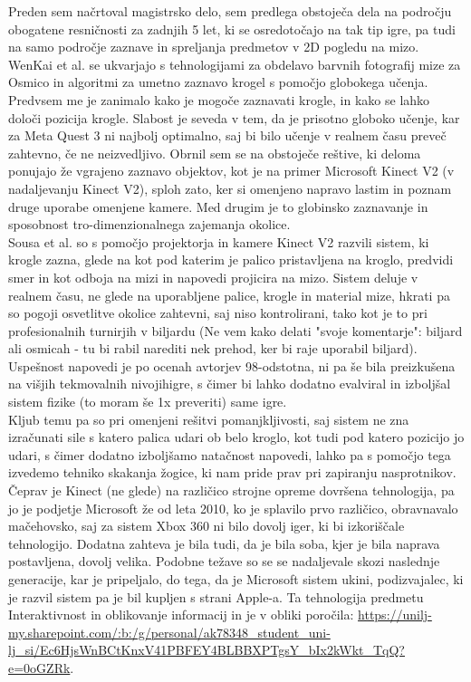 \documentclass[a4paper, 12pt]{article}
\begin{document}
Preden sem načrtoval magistrsko delo, sem predlega obstoječa dela na področju obogatene resničnosti
za zadnjih 5 let, ki se osredotočajo na tak tip igre, pa tudi na samo področje zaznave in
spreljanja predmetov v 2D pogledu na mizo. WenKai et al. \cite{WenKai2024} se ukvarjajo s tehnologijami za
obdelavo barvnih fotografij mize za Osmico in algoritmi za umetno zaznavo krogel s pomočjo
globokega učenja. Predvsem me je zanimalo kako je mogoče zaznavati krogle, in kako se lahko določi
pozicija krogle. Slabost je seveda v tem, da je prisotno globoko učenje, kar za Meta
Quest 3 ni najbolj optimalno, saj bi bilo učenje v realnem času preveč zahtevno, če ne neizvedljivo.
Obrnil sem se na obstoječe reštive, ki deloma ponujajo že vgrajeno zaznavo objektov, kot je na primer
Microsoft Kinect V2 (v nadaljevanju Kinect V2), sploh zato, ker si omenjeno napravo lastim in poznam druge uporabe omenjene
kamere. Med drugim je to globinsko zaznavanje in sposobnost tro-dimenzionalnega zajemanja okolice. \\
Sousa et al. \cite{Sousa2016} so s pomočjo projektorja in kamere Kinect V2 razvili sistem,
ki krogle zazna, glede na kot pod katerim je palico pristavljena na kroglo, predvidi smer in kot odboja
na mizi in napovedi projicira na mizo. Sistem deluje v realnem času, ne glede na uporabljene palice,
krogle in material mize, hkrati pa so pogoji osvetlitve okolice zahtevni, saj niso kontrolirani, tako kot je
to pri profesionalnih turnirjih v biljardu (Ne vem kako delati "svoje komentarje": biljard ali osmicah - tu bi rabil
narediti nek prehod, ker bi raje uporabil biljard). Uspešnost napovedi je po ocenah avtorjev 98-odstotna, ni pa še bila preizkušena na višjih 
tekmovalnih nivojihigre, s čimer bi lahko dodatno evalviral in izboljšal sistem fizike (to moram še 1x preveriti) same igre.  \\
Kljub temu pa so pri omenjeni rešitvi pomanjkljivosti, saj sistem ne zna izračunati
sile s katero palica udari ob belo kroglo, kot tudi pod katero pozicijo jo udari, s čimer
dodatno izboljšamo natačnost napovedi, lahko pa s pomočjo tega izvedemo tehniko skakanja žogice, ki nam pride prav pri zapiranju nasprotnikov. \\
Čeprav je Kinect (ne glede) na različico strojne opreme dovršena tehnologija, pa jo je
podjetje Microsoft že od leta 2010, ko je splavilo prvo različico, obravnavalo mačehovsko,
saj za sistem Xbox 360 ni bilo dovolj iger, ki bi izkoriščale tehnologijo. Dodatna zahteva je bila
tudi, da je bila soba, kjer je bila naprava postavljena, dovolj velika. Podobne težave so se
se nadaljevale skozi naslednje generacije, kar je pripeljalo, do tega, da je Microsoft sistem
ukini, podizvajalec, ki je razvil sistem pa je bil kupljen s strani Apple-a. Ta tehnologija
predmetu Interaktivnost in oblikovanje informacij in je v obliki poročila: \url{https://unilj-my.sharepoint.com/:b:/g/personal/ak78348_student_uni-lj_si/Ec6HjsWnBCtKnxV41PBFEY4BLBBXPTgsY_bIx2kWkt_TqQ?e=0oGZRk}. \\
\end{document}
